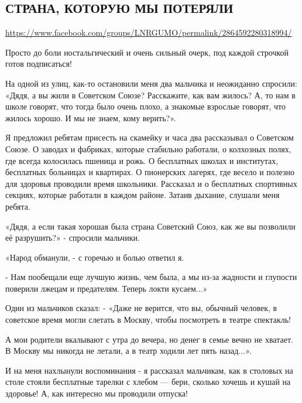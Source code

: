  
 
  
\subsection{СТРАНА, КОТОРУЮ МЫ ПОТЕРЯЛИ}
\url{https://www.facebook.com/groups/LNRGUMO/permalink/2864592280318994/}


Просто до боли ностальгический и очень сильный очерк, под каждой строчкой готов
подписаться!

На одной из улиц, как-то остановили меня два мальчика и неожиданно спросили:
«Дядя, а вы жили в Советском Союзе? Расскажите, как вам жилось? А, то нам в
школе говорят, что тогда было очень плохо, а знакомые взрослые говорят, что
жилось хорошо. И мы не знаем, кому верить?».

Я предложил ребятам присесть на скамейку и часа два рассказывал о Советском
Союзе. О заводах и фабриках, которые стабильно работали, о колхозных полях, где
всегда колосилась пшеница и рожь. О бесплатных школах и институтах, бесплатных
больницах и квартирах.  О пионерских лагерях, где весело и полезно для здоровья
проводили время школьники. Рассказал и о бесплатных спортивных секциях, которые
работали в каждом районе.  Затаив дыхание, слушали меня ребята.

«Дядя, а если такая хорошая была страна Советский Союз, как же вы позволили её
разрушить?» - спросили мальчики.

«Народ обманули, - с горечью и болью ответил я.

- Нам пообещали еще лучшую жизнь, чем была, а мы из-за жадности и глупости
поверили лжецам и предателям. Теперь локти кусаем...»

Один из мальчиков сказал: - «Даже не верится, что вы, обычный человек, в
советское время могли слетать в Москву, чтобы посмотреть в театре спектакль!

А мои родители вкалывают с утра до вечера, но денег в семье вечно не хватает. В
Москву мы никогда не летали, а в театр ходили лет пять назад...».

И на меня нахлынули воспоминания - я рассказал мальчикам, как в столовых на
столе стояли бесплатные тарелки с хлебом --- бери, сколько хочешь и кушай на
здоровье! А, как интересно мы проводили отпуска!


